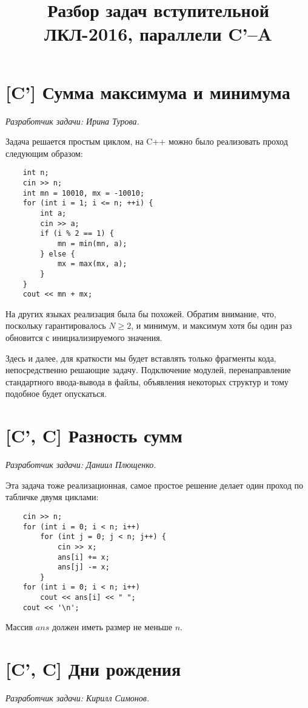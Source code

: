 \documentclass[12pt]{article}
\theoremstyle{definition}
\begin{document}
\title{Разбор задач вступительной ЛКЛ-2016, параллели C'--A}
\date{}

\renewcommand{\thesection}{\Alph{section}.}
\maketitle

\tableofcontents
\pagebreak
\section{[C'] Сумма максимума и минимума}
\textit{Разработчик задачи: Ирина Турова.}

Задача решается простым циклом, на C++ можно было реализовать проход следующим образом:
\begin{lstlisting}
    int n;
    cin >> n;
    int mn = 10010, mx = -10010;
    for (int i = 1; i <= n; ++i) {
        int a;
        cin >> a;
        if (i % 2 == 1) {
            mn = min(mn, a);
        } else {
            mx = max(mx, a);
        }
    }
    cout << mn + mx;
\end{lstlisting}
На других языках реализация была бы похожей. Обратим внимание, что, поскольку гарантировалось $N \ge 2$, и минимум, и максимум хотя бы один раз обновится с инициализируемого значения.

Здесь и далее, для краткости мы будет вставлять только фрагменты кода, непосредственно
решающие задачу. Подключение модулей, перенаправление стандартного ввода-вывода в файлы,
объявления некоторых структур и тому подобное будет опускаться.


\pagebreak
\section{[C', C] Разность сумм}
\textit{Разработчик задачи: Даниил Плющенко.}

Эта задача тоже реализационная, самое простое решение делает один проход по табличке
двумя циклами:
\begin{lstlisting}
    cin >> n;
    for (int i = 0; i < n; i++)
        for (int j = 0; j < n; j++) {
            cin >> x;
            ans[i] += x;
            ans[j] -= x;
        }
    for (int i = 0; i < n; i++)
        cout << ans[i] << " ";
    cout << '\n';
\end{lstlisting}
Массив $ans$ должен иметь размер не меньше $n$.

\section{[C', C] Дни рождения}
\textit{Разработчик задачи: Кирилл Симонов.}
\end{document}
